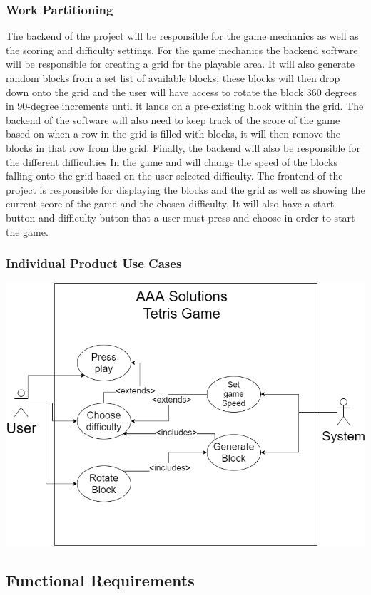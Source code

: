 \documentclass[12pt, titlepage]{article}
\begin{document}
\subsubsection{Work Partitioning}
The backend of the project will be responsible for the game mechanics as well as the scoring and difficulty settings. For the game mechanics the backend software will be responsible for creating a grid for the playable area. It will also generate random blocks from a set list of available blocks; these blocks will then drop down onto the grid and the user will have access to rotate the block 360 degrees in 90-degree increments until it lands on a pre-existing block within the grid. The backend of the software will also need to keep track of the score of the game based on when a row in the grid is filled with blocks, it will then remove the blocks in that row from the grid. Finally, the backend will also be responsible for the different difficulties In the game and will change the speed of the blocks falling onto the grid based on the user selected difficulty. The frontend of the project is responsible for displaying the blocks and the grid as well as showing the current score of the game and the chosen difficulty. It will also have a start button and difficulty button that a user must press and choose in order to start the game. 

\subsubsection{Individual Product Use Cases}

\includegraphics[width=0.95\linewidth]{usecasexa3.png}

\subsection{Functional Requirements}
\end{document}
